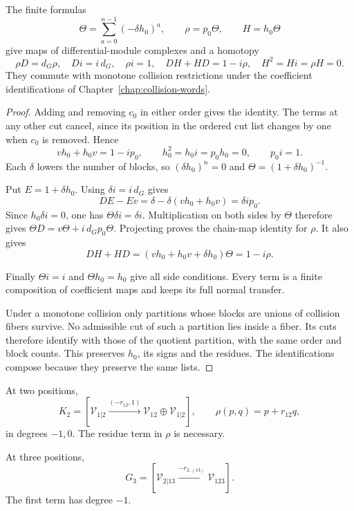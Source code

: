 \begin{theorem}\label{cbc:ct:retract}
The finite formulas
\begin{equation}\label{cbc:ct:finite-retract}
 \Theta=\sum_{a=0}^{n-1}(-\delta h_0)^a,
       \qquad \rho=p_0\Theta,\qquad H=h_0\Theta
\end{equation}
give maps of differential-module complexes and a homotopy
\[
 \rho D=d_G\rho,\quad D i=i\,d_G,\quad \rho i=1,\quad
 DH+HD=1-i\rho,\quad H^2=Hi=\rho H=0.
\]
They commute with monotone collision restrictions under the
coefficient identifications of Chapter~\ref{chap:collision-words}.
\end{theorem}

\begin{proof}
Adding and removing $c_0$ in either order gives the identity.
The terms at any other cut cancel, since its position in the
ordered cut list changes by one when $c_0$ is removed. Hence
\[
 vh_0+h_0v=1-ip_0,\qquad
 h_0^2=h_0i=p_0h_0=0,\qquad p_0i=1.
\]
Each $\delta$ lowers the number of blocks, so
$(\delta h_0)^n=0$ and $\Theta=(1+\delta h_0)^{-1}$.

Put $E=1+\delta h_0$. Using $\delta i=i\,d_G$ gives
\[
 DE-Ev=\delta-\delta(vh_0+h_0v)=\delta ip_0.
\]
Since $h_0\delta i=0$, one has $\Theta\delta i=\delta i$.
Multiplication on both sides by $\Theta$ therefore gives
$\Theta D=v\Theta+i\,d_Gp_0\Theta$. Projecting proves the
chain-map identity for $\rho$. It also gives
\[
 DH+HD=(vh_0+h_0v+\delta h_0)\Theta=1-i\rho.
\]

Finally $\Theta i=i$ and $\Theta h_0=h_0$ give all side
conditions. Every term is a finite composition of coefficient
maps and keeps its full normal transfer.

Under a monotone collision only partitions whose blocks are
unions of collision fibers survive. No admissible cut of such a
partition lies inside a fiber. Its cuts therefore identify with
those of the quotient partition, with the same order and block
counts. This preserves $h_0$, its signs and the residues. The
identifications compose because they preserve the same lists.
\end{proof}

At two positions,
\[
 K_2=[\mathcal V_{1|2}\xrightarrow{(-r_{12},1)}
           \mathcal V_{12}\oplus\mathcal V_{1|2}],\qquad
 \rho(p,q)=p+r_{12}q,
\]
in degrees $-1,0$. The residue term in $\rho$ is necessary.

At three positions,
\[
 G_3=[\mathcal V_{2|13}\xrightarrow{-r_{2,(13)}}
                         \mathcal V_{123}].
\]
The first term has degree $-1$.

